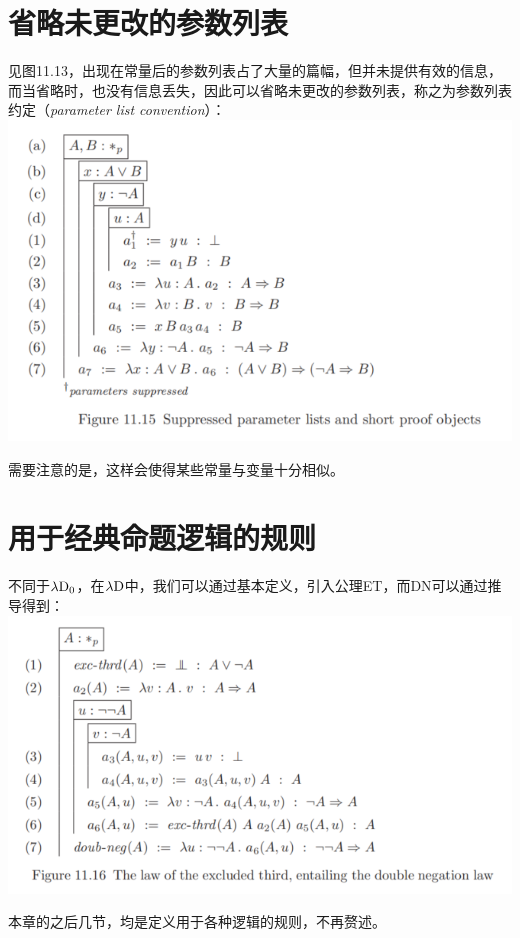 \documentclass[UTF8]{article}
\begin{document}
	\section{省略未更改的参数列表}
	\noindent
	见图11.13，出现在常量后的参数列表占了大量的篇幅，但并未提供有效的信息，而当省略时，也没有信息丢失，因此可以省略未更改的参数列表，称之为参数列表约定（\textit{parameter list convention}）：\\
	\includegraphics[width=0.93\linewidth]{"../imgs/11-8.png"}
	
		需要注意的是，这样会使得某些常量与变量十分相似。
		
	\section{用于经典命题逻辑的规则}
	\noindent
	不同于$\lambda{\rm D_0}$，在$\lambda{\rm D}$中，我们可以通过基本定义，引入公理ET，而DN可以通过推导得到：\\
	\includegraphics[width=0.93\linewidth]{"../imgs/11-9.png"}
	
		本章的之后几节，均是定义用于各种逻辑的规则，不再赘述。
\end{document}
